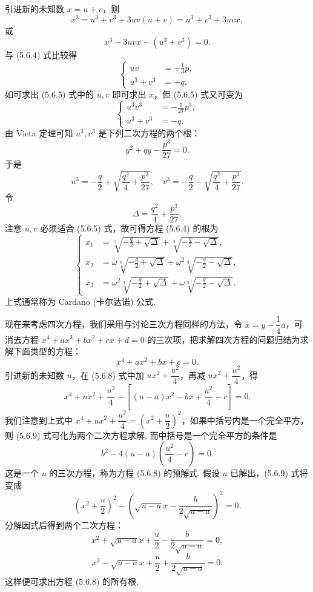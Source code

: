 \documentclass[UTF8, 12pt, fontset=fandol, oneside]{ctexart}
\begin{document}
引进新的未知数 $x=u+v$，则
\[
x^3=u^3+v^3+3uv(u+v)=u^3+v^3+3uvx,
\]
或
\[
x^3-3uvx-(u^3+v^3)=0.
\]
与 (5.6.4) 式比较得
\begin{equation}
\left\{
\begin{aligned}
uv&=-\frac13p,\\
u^3+v^3&=-q.
\end{aligned}
\right.
\tag{5.6.5}
\end{equation}
如可求出 (5.6.5) 式中的 $u,v$ 即可求出 $x$，但 (5.6.5) 式又可变为
\begin{equation}
\left\{
\begin{aligned}
u^3v^3&=-\frac1{27}p^3,\\
u^3+v^3&=-q.
\end{aligned}
\right.
\tag{5.6.6}
\end{equation}
由 Vieta 定理可知 $u^3,v^3$ 是下列二次方程的两个根：
\[
y^2+qy-\frac{p^3}{27}=0.
\]
于是
\[
u^3=-\frac q2+\sqrt{\frac{q^2}{4}+\frac{p^3}{27}},\quad
v^3=-\frac q2-\sqrt{\frac{q^2}{4}+\frac{p^3}{27}}.
\]
令
\[
\Delta=\frac{q^2}{4}+\frac{p^3}{27},
\]
注意 $u,v$ 必须适合 (5.6.5) 式，故可得方程 (5.6.4) 的根为
\begin{equation}
\left\{
\begin{aligned}
x_1&=\sqrt[3]{-\frac q2+\sqrt{\Delta}}+\sqrt[3]{-\frac q2-\sqrt{\Delta}},\\
x_2&=\omega\sqrt[3]{-\frac q2+\sqrt{\Delta}}+\omega^2\sqrt[3]{-\frac q2-\sqrt{\Delta}},\\
x_3&=\omega^2\sqrt[3]{-\frac q2+\sqrt{\Delta}}+\omega\sqrt[3]{-\frac q2-\sqrt{\Delta}}.
\end{aligned}
\right.
\tag{5.6.7}
\end{equation}
上式通常称为 Cardano (卡尔达诺) 公式.

现在来考虑四次方程，我们采用与讨论三次方程同样的方法，令 $x=y-\dfrac14a$，可消去方程 $x^4+ax^3+bx^2+cx+d=0$ 的三次项，把求解四次方程的问题归结为求解下面类型的方程：
\begin{equation}
x^4+ax^2+bx+c=0.
\tag{5.6.8}
\end{equation}
引进新的未知数 $u$，在 (5.6.8) 式中加 $ux^2+\dfrac{u^2}{4}$，再减 $ux^2+\dfrac{u^2}{4}$，得
\begin{equation}
x^4+ux^2+\frac{u^2}{4}-\left[(u-a)x^2-bx+\frac{u^2}{4}-c\right]=0.
\tag{5.6.9}
\end{equation}
我们注意到上式中 $x^4+ux^2+\dfrac{u^2}{4}=\left(x^2+\dfrac{u}{2}\right)^2$，如果中括号内是一个完全平方，则 (5.6.9) 式可化为两个二次方程求解. 而中括号是一个完全平方的条件是
\begin{equation}
b^2-4(u-a)\left(\frac{u^2}{4}-c\right)=0.
\tag{5.6.10}
\end{equation}
这是一个 $u$ 的三次方程，称为方程 (5.6.8) 的预解式. 假设 $u$ 已解出，(5.6.9) 式将变成
\[
\left(x^2+\frac u2\right)^2-\left(\sqrt{u-a}x-\frac{b}{2\sqrt{u-a}}\right)^2=0.
\]
分解因式后得到两个二次方程：
\begin{equation}
x^2+\sqrt{u-a}x+\frac u2-\frac{b}{2\sqrt{u-a}}=0,
\tag{5.6.11}
\end{equation}
\begin{equation}
x^2-\sqrt{u-a}x+\frac u2+\frac{b}{2\sqrt{u-a}}=0.
\tag{5.6.12}
\end{equation}
这样便可求出方程 (5.6.8) 的所有根.
\end{document}
